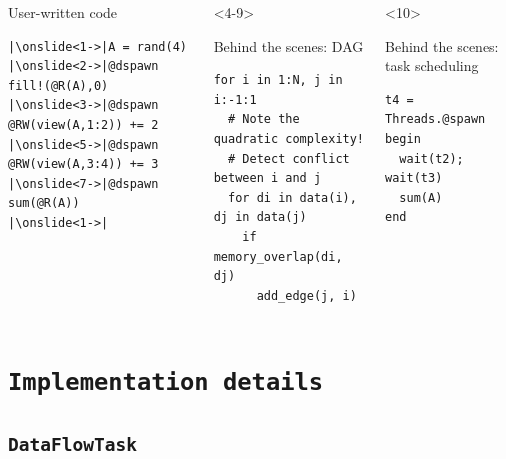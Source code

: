 \documentclass{beamer}
\begin{document}
\begin{frame}[fragile]

\vspace{-1em}
\begin{columns}[T]
\begin{exampleblock}{User-written code}
\begin{verbatim}
|\onslide<1->|A = rand(4)
|\onslide<2->|@dspawn fill!(@R(A),0)
|\onslide<3->|@dspawn @RW(view(A,1:2)) += 2
|\onslide<5->|@dspawn @RW(view(A,3:4)) += 3
|\onslide<7->|@dspawn sum(@R(A))
|\onslide<1->|
\end{verbatim}    
\end{exampleblock}
  
\begin{onlyenv}<4-9>
  \begin{exampleblock}{Behind the scenes: DAG}
\begin{verbatim}
for i in 1:N, j in i:-1:1
  # Note the quadratic complexity!
  # Detect conflict between i and j
  for di in data(i), dj in data(j)
    if memory_overlap(di, dj)
      add_edge(j, i)
\end{verbatim}
\end{exampleblock}
\end{onlyenv}
\begin{onlyenv}<10>
\begin{exampleblock}{Behind the scenes: task scheduling}
\begin{verbatim}
t4 = Threads.@spawn begin
  wait(t2); wait(t3)
  sum(A)
end
\end{verbatim}
\end{exampleblock}
\end{onlyenv}
\end{columns}


\end{frame}


\section{\texttt{Implementation details}}

\subsection{\texttt{DataFlowTask}}
\end{document}
